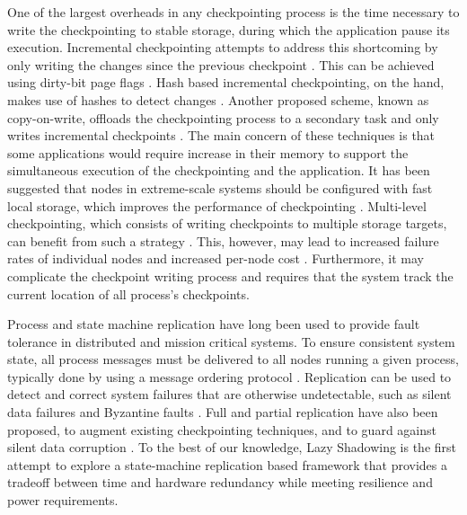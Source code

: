One of the largest overheads in any checkpointing process is the time necessary to write the checkpointing 
to stable storage, during which the application pause its execution. Incremental checkpointing attempts
to address this shortcoming by only writing the changes since the previous checkpoint \cite{nam_ftc_1997,Agarwal:04:Adaptive}. This
can be achieved using dirty-bit page flags \cite{plank_ftcs_1994,elnozahy_1992_manetho}. Hash based incremental checkpointing, on the
hand, makes use of hashes to detect changes \cite{nam_ftc_1997,Agarwal:04:Adaptive}. Another proposed scheme, known as copy-on-write,
offloads the checkpointing process to a secondary task and only writes incremental checkpoints \cite{li_trans_1994}.
The main concern of these techniques is that some applications would require increase in their
memory to support the simultaneous execution of the checkpointing and the application. It has been suggested that nodes in extreme-scale systems should be configured with fast local storage, which
improves the performance of checkpointing \cite{doe_ascr_exascale_2011}. Multi-level checkpointing, which consists of
writing checkpoints to multiple storage targets, can benefit from such a strategy \cite{Moody:10:SCR,hakkarine_2013}. This,
however, may lead to increased failure rates of individual nodes and increased per-node cost \cite{chen_2011_hystor}.
Furthermore, it may complicate the checkpoint writing process and requires that the system track the
current location of all process's checkpoints.


Process and state machine replication have long been used to provide fault tolerance in distributed and mission critical systems. %
To ensure consistent system state, all process messages must
be delivered to all nodes running a given process, typically done by using a message ordering protocol 
\cite{lamport_trans_1998}. Replication can be used to detect and correct system failures that are otherwise undetectable,
such as silent data failures \cite{ni_2013_acr} and Byzantine faults \cite{fiala_2012_sdc}. %
Full and partial
replication have also been proposed, to augment existing checkpointing techniques, and to guard
against silent data corruption \cite{stearly_2012_partial,elliott_2012_cpr}. %
To the best of our knowledge,
Lazy Shadowing is the first attempt to explore a state-machine replication based framework
that provides a tradeoff between time and hardware redundancy while meeting resilience and
power requirements.